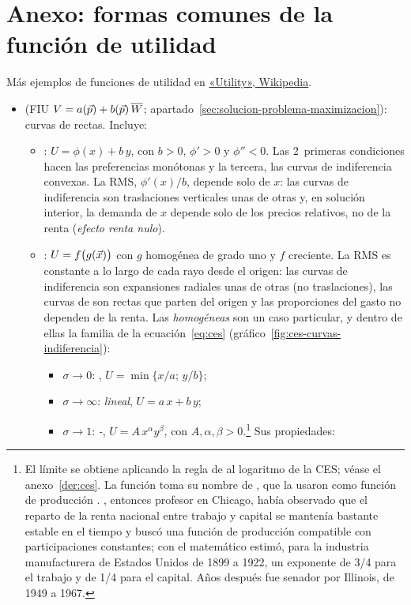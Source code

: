 \documentclass[11pt]{article}
\begin{document}
\section{Anexo: formas comunes de la función de utilidad}\label{anexo:formas}

Más ejemplos de funciones de utilidad en \href{https://en.wikipedia.org/wiki/Utility\#Examples}{«Utility», Wikipedia}.

\begin{itemize}
\item {} (FIU $V=a(\vec{p})+b(\vec{p})\,\overline{W}$; apartado~\ref{sec:solucion-problema-maximizacion}): curvas de  rectas. Incluye:
  \begin{itemize}
  \item {}: $U=\phi(x)+b\,y$, con $b>0$, $\phi'>0$ y $\phi''<0$. Las 2~primeras condiciones hacen las preferencias monótonas y la tercera, las curvas de indiferencia convexas. La RMS, $\phi'(x)/b$, depende solo de $x$: las curvas de indiferencia son traslaciones verticales unas de otras y, en solución interior, la demanda de $x$ depende solo de los precios relativos, no de la renta (\emph{efecto renta nulo}).
  \item {}: $U=f\big(g(\vec{x})\big)$ con $g$ homogénea de grado uno y $f$ creciente. La RMS es constante a lo largo de cada rayo desde el origen: las curvas de indiferencia son expansiones radiales unas de otras (no traslaciones), las curvas de  son rectas que parten del origen y las proporciones del gasto no dependen de la renta. Las \emph{homogéneas} son un caso particular, y dentro de ellas la familia  de la ecuación~\eqref{eq:ces} (gráfico~\ref{fig:ces-curvas-indiferencia}):
    \begin{itemize}
    \item $\sigma\to 0$: \emph{}, $U=\min\{x/a;\,y/b\}$;
    \item $\sigma\to\infty$: \emph{lineal}, $U=a\,x+b\,y$;
    \item $\sigma\to 1$: \emph{-}, $U=A\,x^{\alpha}y^{\beta}$, con $A,\alpha,\beta>0$.\footnote{El límite se obtiene aplicando la regla de  al logaritmo de la CES\nocite{ArrowEtAl1961Capital}; véase el anexo~\ref{der:ces}. La función toma su nombre de \textcite{CobbDouglas1928Theory}, que la usaron como función de producción . , entonces profesor en Chicago, había observado que el reparto de la renta nacional entre trabajo y capital se mantenía bastante estable en el tiempo y buscó una función de producción compatible con participaciones constantes; con el matemático  estimó, para la industria manufacturera de Estados Unidos de 1899 a 1922, un exponente de 3/4 para el trabajo y de 1/4 para el capital\nocite{Douglas1976Once}. Años después fue senador por Illinois, de 1949 a 1967.} Sus propiedades:

\end{itemize}
\end{itemize}
\end{itemize}
\end{document}

